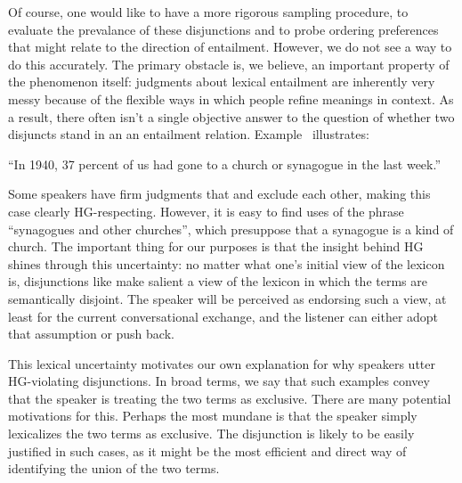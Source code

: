 \documentclass{article}
\begin{document}
Of course, one would like to have a more rigorous sampling procedure,
to evaluate the prevalance of these disjunctions and to probe ordering
preferences that might relate to the direction of entailment. However,
we do not see a way to do this accurately. The primary obstacle is, we
believe, an important property of the phenomenon itself: judgments
about lexical entailment are inherently very messy because of the
flexible ways in which people refine meanings in context. As a result,
there often isn't a single objective answer to the question of whether
two disjuncts stand in an an entailment
relation. Example~ illustrates:
%
\begin{examples}
\item\label{churchorsynagogue} ``In 1940, 37 percent of us had gone to
  a church or synagogue in the last week.''
\end{examples}
%
Some speakers have firm judgments that  and
 exclude each other, making this case clearly
HG-respecting. However, it is easy to find uses of the phrase
``synagogues and other churches'', which presuppose that a synagogue
is a kind of church. The important thing for our purposes is that the
insight behind HG shines through this uncertainty: no matter what
one's initial view of the lexicon is, disjunctions like  make salient a view of the lexicon in which the terms
are semantically disjoint. The speaker will be perceived as endorsing
such a view, at least for the current conversational exchange, and the
listener can either adopt that assumption or push back.

This lexical uncertainty motivates our own explanation for why
speakers utter HG-violating disjunctions. In broad terms, we say that
such examples convey that the speaker is treating the two terms as
exclusive. There are many potential motivations for this. Perhaps the
most mundane is that the speaker simply lexicalizes the two terms as
exclusive. The disjunction is likely to be easily justified in such
cases, as it might be the most efficient and direct way of identifying
the union of the two terms.

\end{document}
